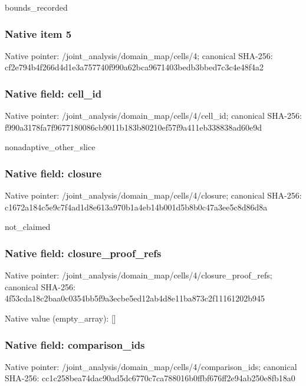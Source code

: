\documentclass[10pt,a4paper]{article}
\begin{document}
\begingroup\raggedright\sloppy bounds\_\allowbreak{}recorded\par\endgroup

\subsubsection{Native item 5}
Native pointer: /joint\_\allowbreak{}analysis/domain\_\allowbreak{}map/cells/4; canonical SHA-256: cf2e794b4f266d4d1e3a757740f990a62bca9671403bedb3bbed7c3c4e48f4a2

\subsubsection{Native field: cell\_\allowbreak{}id}
Native pointer: /joint\_\allowbreak{}analysis/domain\_\allowbreak{}map/cells/4/cell\_\allowbreak{}id; canonical SHA-256: f990a3178fa7f9677180086cb9011b183b80210ef57f9a411eb338838ad60e9d

\begingroup\raggedright\sloppy nonadaptive\_\allowbreak{}other\_\allowbreak{}slice\par\endgroup

\subsubsection{Native field: closure}
Native pointer: /joint\_\allowbreak{}analysis/domain\_\allowbreak{}map/cells/4/closure; canonical SHA-256: c1672a184c5e9c7f4ad1d8e613a970b1a4eb14b001d5b8b0c47a3ee5c8d86d8a

\begingroup\raggedright\sloppy not\_\allowbreak{}claimed\par\endgroup

\subsubsection{Native field: closure\_\allowbreak{}proof\_\allowbreak{}refs}
Native pointer: /joint\_\allowbreak{}analysis/domain\_\allowbreak{}map/cells/4/closure\_\allowbreak{}proof\_\allowbreak{}refs; canonical SHA-256: 4f53cda18c2baa0c0354bb5f9a3ecbe5ed12ab4d8e11ba873c2f11161202b945

Native value (empty\_\allowbreak{}array): []

\subsubsection{Native field: comparison\_\allowbreak{}ids}
Native pointer: /joint\_\allowbreak{}analysis/domain\_\allowbreak{}map/cells/4/comparison\_\allowbreak{}ids; canonical SHA-256: cc1c258bea74dac90ad5dc6770c7ca788016b0ffbf676ff2e94ab250e8fb18a0
\end{document}
